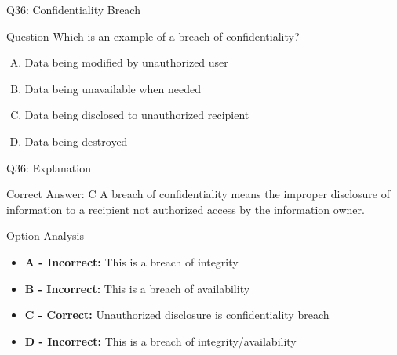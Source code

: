 \documentclass{beamer}
\begin{document}
	\begin{frame}{Q36: Confidentiality Breach}
		\begin{block}{Question}
			Which is an example of a breach of confidentiality?
		\end{block}
		\begin{enumerate}[(A)]
			\item Data being modified by unauthorized user
			\item Data being unavailable when needed
			\item Data being disclosed to unauthorized recipient
			\item Data being destroyed
		\end{enumerate}
	\end{frame}
	
	\begin{frame}{Q36: Explanation}
		\begin{block}{Correct Answer: C}
			A breach of confidentiality means the improper disclosure of information to a recipient not authorized access by the information owner.
		\end{block}
		\begin{block}{Option Analysis}
			\begin{itemize}
				\item \textbf{A - Incorrect:} This is a breach of integrity
				\item \textbf{B - Incorrect:} This is a breach of availability
				\item \textbf{C - Correct:} Unauthorized disclosure is confidentiality breach
				\item \textbf{D - Incorrect:} This is a breach of integrity/availability
			\end{itemize}
		\end{block}
	\end{frame}
	
\end{document}
